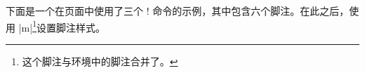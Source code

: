 
% 
% 

下面是一个在页面中使用了三个 \!\switchcolumn! 命令的示例，其中包含六个脚注。在此之后，使用 \Uidx{\!\footnotelayout!}|{m}|\footnote{这个脚注与环境中的脚注合并了。}设置脚注样式。
% 
% 

